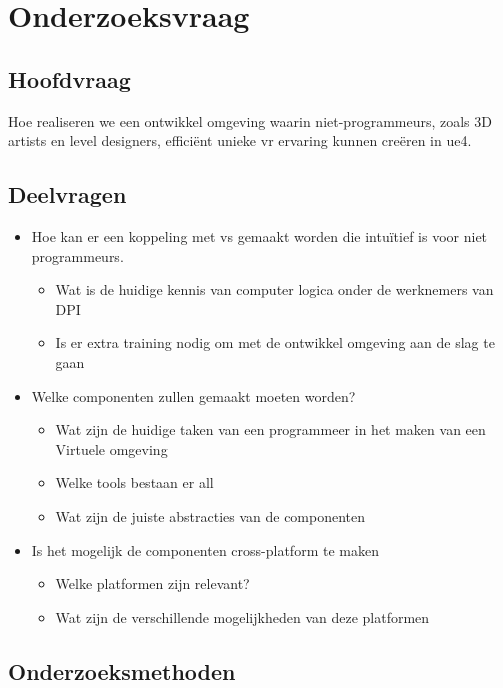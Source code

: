 \section{Onderzoeksvraag}

\subsection{Hoofdvraag}

Hoe realiseren we een ontwikkel omgeving waarin niet-programmeurs, zoals 3D artists en level designers, efficiënt unieke \gls{vr} ervaring kunnen creëren in \gls{ue4}.

\subsection{Deelvragen}

\begin{itemize}  
\item Hoe kan er een koppeling met \gls{vs} gemaakt worden die intuïtief is voor niet programmeurs. 
	\begin{itemize}
	\item Wat is de huidige kennis van computer logica onder de werknemers van DPI
	\item Is er extra training nodig om met de ontwikkel omgeving aan de slag te gaan
	\end{itemize}
\item Welke componenten zullen gemaakt moeten worden?
	\begin{itemize}
	\item Wat zijn de huidige taken van een programmeer in het maken van een Virtuele omgeving
	\item Welke tools bestaan er all
	\item Wat zijn de juiste abstracties van de componenten 
	\end{itemize}
\item Is het mogelijk de componenten cross-platform te maken 
	\begin{itemize}
	\item Welke platformen zijn relevant?
	\item Wat zijn de verschillende mogelijkheden van deze platformen
	\end{itemize}
\end{itemize}

\subsection{Onderzoeksmethoden}

